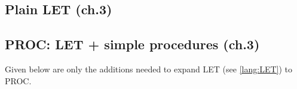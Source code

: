 \documentclass[../codeprint.tex]{subfiles}
\begin{document}
\subsection{Plain LET (ch.3)}
\label{lang:LET}



\subsection{PROC: LET + simple procedures (ch.3)}
\label{lang:PROC}
Given below are only the additions needed to expand LET (see \autoref{lang:LET}) to PROC.


\end{document}
